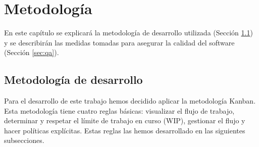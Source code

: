 \chapter{Metodología}\label{cap:metodologia}
En este capítulo se explicará la metodología de desarrollo utilizada (Sección \ref{cap:Kanban}) y se describirán las medidas tomadas para asegurar la calidad del software (Sección \ref{sec:qa}).

\section{Metodología de desarrollo}\label{cap:Kanban}
Para el desarrollo de este trabajo hemos decidido aplicar la metodología Kanban. Esta metodología tiene cuatro reglas básicas: visualizar el flujo de trabajo, determinar y respetar el límite de trabajo en curso (WIP), gestionar el flujo y hacer políticas explícitas. Estas reglas las hemos desarrollado en las siguientes subsecciones.

